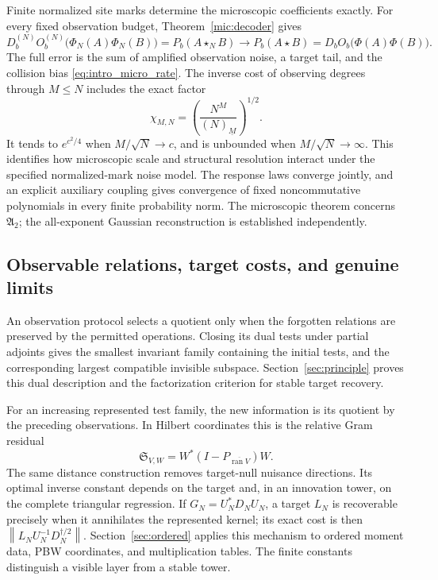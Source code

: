 \documentclass[11pt,a4paper]{amsart}
\numberwithin{equation}{section}
\theoremstyle{definition}
\theoremstyle{remark}
\newcommand{\Alg}{\mathfrak A}
\DeclareMathOperator{\ran}{ran}
\newcommand{\norm}[1]{\left\lVert#1\right\rVert}
\begin{document}
Finite normalized site marks determine the microscopic coefficients exactly. For every fixed observation budget, Theorem~\ref{mic:decoder} gives
\[
 D_b^{(N)}O_b^{(N)}\bigl(\Phi_N(A)\Phi_N(B)\bigr)
 =P_b(A\star_NB)\longrightarrow
 P_b(A\star B)=D_bO_b\bigl(\Phi(A)\Phi(B)\bigr).
\]
The full error is the sum of amplified observation noise, a target tail, and the collision bias \eqref{eq:intro_micro_rate}. The inverse cost of observing degrees through $M\le N$ includes the exact factor
\[
 \chi_{M,N}=\left(\frac{N^M}{(N)_{\underline M}}\right)^{1/2}.
\]
It tends to $e^{c^2/4}$ when $M/\sqrt N\to c$, and is unbounded when $M/\sqrt N\to\infty$. This identifies how microscopic scale and structural resolution interact under the specified normalized-mark noise model. The response laws converge jointly, and an explicit auxiliary coupling gives convergence of fixed noncommutative polynomials in every finite probability norm. The microscopic theorem concerns $\Alg_2$; the all-exponent Gaussian reconstruction is established independently.

\subsection{Observable relations, target costs, and genuine limits}
An observation protocol selects a quotient only when the forgotten relations are preserved by the permitted operations. Closing its dual tests under partial adjoints gives the smallest invariant family containing the initial tests, and the corresponding largest compatible invisible subspace. Section~\ref{sec:principle} proves this dual description and the factorization criterion for stable target recovery.

For an increasing represented test family, the new information is its quotient by the preceding observations. In Hilbert coordinates this is the relative Gram residual
\[
 \mathfrak S_{V,W}=W^*(I-P_{\overline{\ran V}})W.
\]
The same distance construction removes target-null nuisance directions. Its optimal inverse constant depends on the target and, in an innovation tower, on the complete triangular regression. If $G_N=U_N^*D_NU_N$, a target $L_N$ is recoverable precisely when it annihilates the represented kernel; its exact cost is then
$\norm{L_NU_N^{-1}D_N^{\dagger/2}}$.
Section~\ref{sec:ordered} applies this mechanism to ordered moment data, PBW coordinates, and multiplication tables. The finite constants distinguish a visible layer from a stable tower.
\end{document}
